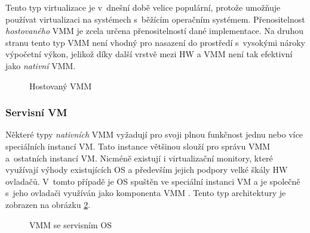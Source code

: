 Tento typ virtualizace je v~dnešní době velice populární, protože umožňuje používat virtualizaci na systémech s~běžícím operačním 
systémem. Přenositelnost \textit{hostovaného} VMM je zcela určena přenositelností dané implementace. Na druhou stranu tento
typ VMM není vhodný pro nasazení do prostředí s~vysokými nároky výpočetní výkon, jelikož díky další vrstvě mezi HW a VMM není tak
efektivní jako \textit{nativní} VMM.
\begin{figure}
    \centering    
    \caption{Hostovaný VMM}
    \label{figure:hosted_vmm}
\end{figure}
\subsubsection{Servisní VM}
\label{chapter:virtualization:vmm:types:servise}
Některé typy \textit{nativních} VMM vyžadují pro svoji plnou funkčnost jednu nebo více speciálních instancí VM. Tato instance
většinou slouží pro správu VMM a~ostatních instancí VM. Nicméně existují i virtualizační monitory, které využívají výhody
existujících OS a především jejich podpory velké škály HW ovladačů. V~tomto případě je OS spuštěn ve speciální instanci VM
a je společně s~jeho ovladači využíván jako komponenta VMM \cite{cvut:presentation:virt1}. Tento typ architektury je zobrazen
na obrázku \ref{figure:servise_vmm}.
\begin{figure}
    \centering    
    \caption{VMM se servisním OS}
    \label{figure:servise_vmm}
\end{figure}